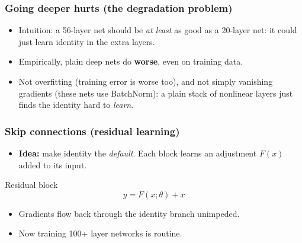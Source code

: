 \begin{frame}
\frametitle{Going deeper hurts (the degradation problem)}
\begin{itemize}
    \item Intuition: a 56-layer net should be \textit{at least} as good as a
    20-layer net: it could just learn identity in the extra layers.
    \pause
    \item Empirically, plain deep nets do \textbf{worse}, even on training data.
\end{itemize}
\begin{center}
\end{center}
\pause
\begin{itemize}
    \item Not overfitting (training error is worse too), and not simply vanishing
    gradients (these nets use BatchNorm): a plain stack of nonlinear layers just
    finds the identity hard to \textit{learn}.
\end{itemize}
\end{frame}

\begin{frame}
\frametitle{Skip connections (residual learning)}
\begin{itemize}
    \item \textbf{Idea:} make identity the \textit{default}. Each block learns
    an adjustment $F(x)$ added to its input.
\end{itemize}
\begin{block}{Residual block}
    $$ y = F(x; \theta) + x $$
\end{block}

\pause
\begin{itemize}
    \item Gradients flow back through the identity branch unimpeded.
    \pause
    \item Now training 100+ layer networks is routine.
\end{itemize}
\end{frame}

